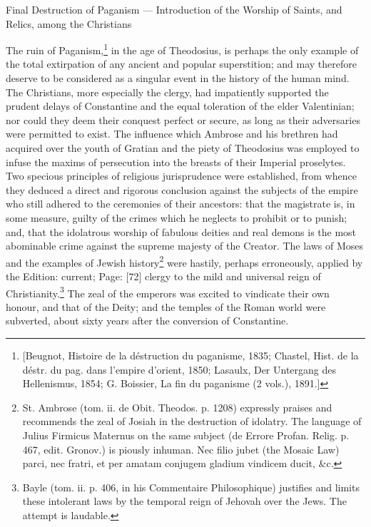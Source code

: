 
Final Destruction of Paganism \texthebrew{—} Introduction of the Worship of Saints, and Relics, among the Christians

The ruin of Paganism,\footnote{[Beugnot, Histoire de la déstruction du paganisme, 1835; Chastel, Hist. de la déstr. du pag. dans l\texthebrew{}’empire d\texthebrew{}’orient, 1850; Lasaulx, Der Untergang des Hellenismus, 1854; G. Boissier, La fin du paganisme (2 vols.), 1891.]} in the age of Theodosius, is perhaps the only example of the total extirpation of any ancient and popular superstition; and may therefore deserve to be considered as a singular event in the history of the human mind. The Christians, more especially the clergy, had impatiently supported the prudent delays of Constantine and the equal toleration of the elder Valentinian; nor could they deem their conquest perfect or secure, as long as their adversaries were permitted to exist. The influence which Ambrose and his brethren had acquired over the youth of Gratian and the piety of Theodosius was employed to infuse the maxims of persecution into the breasts of their Imperial proselytes. Two specious principles of religious jurisprudence were established, from whence they deduced a direct and rigorous conclusion against the subjects of the empire who still adhered to the ceremonies of their ancestors: that the magistrate is, in some measure, guilty of the crimes which he neglects to prohibit or to punish; and, that the idolatrous worship of fabulous deities and real demons is the most abominable crime against the supreme majesty of the Creator. The laws of Moses and the examples of Jewish history\footnote{St. Ambrose (tom. ii. de Obit. Theodos. p. 1208) expressly praises and recommends the zeal of Josiah in the destruction of idolatry. The language of Julius Firmicus Maternus on the same subject (de Errore Profan. Relig. p. 467, edit. Gronov.) is piously inhuman. Nec filio jubet (the Mosaic Law) parci, nec fratri, et per amatam conjugem gladium vindicem ducit, \&c.} were hastily, perhaps erroneously, applied by the Edition: current; Page: [72] clergy to the mild and universal reign of Christianity.\footnote{Bayle (tom. ii. p. 406, in his Commentaire Philosophique) justifies and limits these intolerant laws by the temporal reign of Jehovah over the Jews. The attempt is laudable.} The zeal of the emperors was excited to vindicate their own honour, and that of the Deity; and the temples of the Roman world were subverted, about sixty years after the conversion of Constantine.

